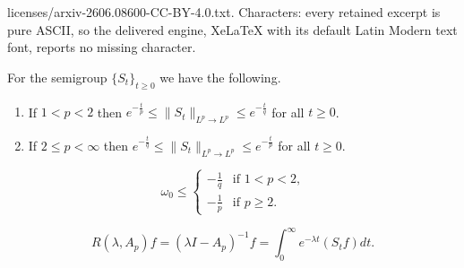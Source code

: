 \documentclass[10pt,a4paper]{amsart}
\renewcommand{\geq}{\geqslant}
\renewcommand{\leq}{\leqslant}
\begin{document}
licenses/arxiv-2606.08600-CC-BY-4.0.txt. Characters: every retained excerpt is pure ASCII, so the delivered engine, XeLaTeX with its default Latin Modern text font, reports no missing character.
\begin{Proposition}\label{9oijrteglkfdsfawfgrdgfds1}
For the semigroup $\{S_t\}_{t \geq 0}$ we have the following. 
\begin{enumerate}
\item If $1 < p < 2$ then $e^{-\frac{t}{p}} \leq \|S_{t}\|_{L^p \to L^p} \leq e^{-\frac{t}{q}}$ for all $t \geq 0$. 
\item If $2 \leq p < \infty$ then $e^{-\frac{t}{q}} \leq \|S_{t}\|_{L^p \to L^p} \leq e^{-\frac{t}{p}}$ for all $t \geq 0$. 
\end{enumerate}
\end{Proposition}

\begin{equation}\label{www000}
\omega_0 \leq \begin{cases}
-\frac{1}{q}& \mbox{if $1 < p < 2$,}\\[4pt]
-\frac{1}{p} &\mbox{if $p \geq 2$.}
\end{cases}
\end{equation}

\begin{equation}\label{LPppp}
R(\lambda,A_p)f =(\lambda I-A_p)^{-1}f =\int_{0}^{\infty}e^{-\lambda t}(S_{t}f)dt.
\end{equation}
\end{document}
